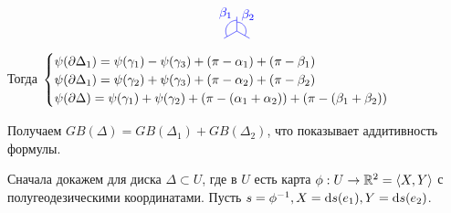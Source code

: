\documentclass[a4paper]{report}
\begin{document}
{{\[\begin{tikzpicture}
              \draw[blue] (0, -{sqrt(3)/2}) -- ({sqrt(3)/5}, {-(sqrt(3)/2+0.2)});
              \draw[blue] (0, -{sqrt(3)/2}) -- ({-sqrt(3)/5}, {-(sqrt(3)/2+0.2)});
              \draw[blue] (0, -{sqrt(3)/2}) -- ({0}, {-(sqrt(3)/2-0.4)});
          \draw[blue,smooth,domain=150:270] plot ({ 0.3 * cos(\x)}, {-(0.3 * sin(\x)+sqrt(3)/2)});
          \draw[blue,smooth,domain=270:390] plot ({ 0.25 * cos(\x)}, {-(0.25 * sin(\x)+sqrt(3)/2)});
              \node[blue,above left] at (0, -0.65) {$\beta_1$};
              \node[blue,above right] at (0, -0.7) {$\beta_2$};
        \end{tikzpicture}\]

        Тогда $\begin{cases}\psi(\partial \Delta_1) = \psi(\gamma_1) - \psi(\gamma_3) + (\pi - \alpha_1) + (\pi - \beta_1) \\ \psi(\partial\Delta_1) = \psi(\gamma_2) + \psi(\gamma_3) + (\pi - \alpha_2) + (\pi - \beta_2) \\ \psi(\partial\Delta) = \psi(\gamma_1) + \psi(\gamma_2) + (\pi - (\alpha_1 + \alpha_2)) + (\pi - (\beta_1 + \beta_2))\end{cases}$

        Получаем $GB(\Delta) = GB(\Delta_1) + GB(\Delta_2)$, что показывает аддитивность формулы.
        \item Сначала докажем для диска $\Delta \subset U$, где в $U$ есть карта $\phi: U \rightarrow \mathbb{R}^2 = \left\langle X, Y\right\rangle$ с полугеодезическими координатами.
        Пусть $s = \phi^{-1}, X = \operatorname{d}\! s(e_1), Y = \operatorname{d}\! s(e_2)$.

}}
\end{document}
